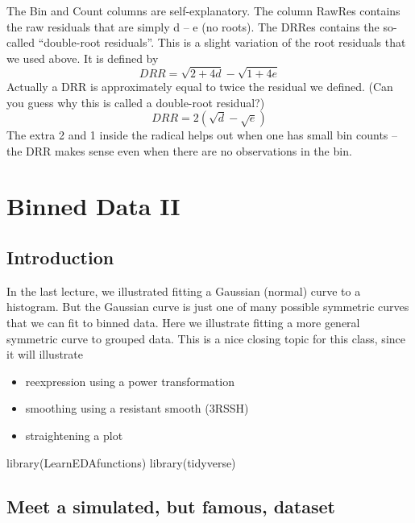 \documentclass[
]{book}
\newenvironment{Shaded}{\begin{snugshade}}{\end{snugshade}}
\newcommand{\FunctionTok}[1]{\textcolor[rgb]{0.00,0.00,0.00}{#1}}
\newcommand{\NormalTok}[1]{#1}
\providecommand{\tightlist}{%
  \setlength{\itemsep}{0pt}\setlength{\parskip}{0pt}}
\begin{document}
The Bin and Count columns are self-explanatory. The column RawRes contains the raw residuals that are simply d -- e (no roots). The DRRes contains the so-called ``double-root residuals''. This is a slight variation of the root residuals that we used above. It is defined by
\[
DRR = \sqrt{2 + 4d} - \sqrt{1+ 4e}
\]
Actually a DRR is approximately equal to twice the residual we defined. (Can you guess why this is called a double-root residual?)
\[
DRR = 2( \sqrt{d} - \sqrt{e})
\]
The extra 2 and 1 inside the radical helps out when one has small bin counts -- the DRR makes sense even when there are no observations in the bin.

\hypertarget{binned-data-ii}{%
\chapter{Binned Data II}\label{binned-data-ii}}

\hypertarget{introduction-1}{%
\section{Introduction}\label{introduction-1}}

In the last lecture, we illustrated fitting a Gaussian (normal) curve to a histogram. But the Gaussian curve is just one of many possible symmetric curves that we can fit to binned data. Here we illustrate fitting a more general symmetric curve to grouped data. This is a nice closing topic for this class, since it will illustrate

\begin{itemize}
\tightlist
\item
  reexpression using a power transformation
\item
  smoothing using a resistant smooth (3RSSH)
\item
  straightening a plot
\end{itemize}

\begin{Shaded}
\begin{Highlighting}[]
\FunctionTok{library}\NormalTok{(LearnEDAfunctions)}
\FunctionTok{library}\NormalTok{(tidyverse)}
\end{Highlighting}
\end{Shaded}

\hypertarget{meet-a-simulated-but-famous-dataset}{%
\section{Meet a simulated, but famous, dataset}\label{meet-a-simulated-but-famous-dataset}}
\end{document}
